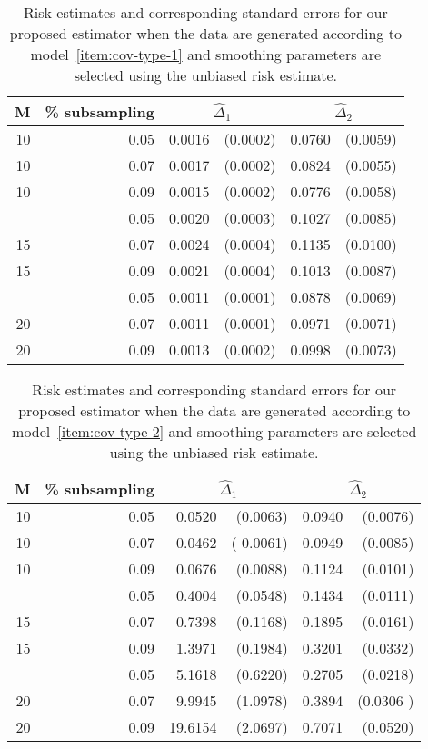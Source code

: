 \begin{table}[H] \label{table:simulation-2-sigma-1}
\centering
\begin{tabular}{rrrrrr}
M & \% subsampling &  \multicolumn{2}{c}{$\hat{\Delta}_1$}  &  \multicolumn{2}{c}{$\hat{\Delta}_2$} \\ 
  \hline
10 & 0.05 & 0.0016 & (0.0002) & 0.0760 & (0.0059) \\ 
  10 & 0.07 & 0.0017 & (0.0002) & 0.0824 & (0.0055) \\ 
  10 & 0.09 & 0.0015 & (0.0002) & 0.0776 & (0.0058) \\ 
    \hdashline
  15 & 0.05 & 0.0020 & (0.0003) & 0.1027 & (0.0085) \\ 
  15 & 0.07 & 0.0024 & (0.0004) & 0.1135 & (0.0100) \\ 
  15 & 0.09 & 0.0021 & (0.0004) & 0.1013 & (0.0087) \\ 
    \hdashline
  20 & 0.05 & 0.0011 & (0.0001) & 0.0878 & (0.0069) \\ 
  20 & 0.07 & 0.0011 & (0.0001) & 0.0971 & (0.0071) \\ 
  20 & 0.09 & 0.0013 & (0.0002) & 0.0998 & (0.0073) \\ 
   \hline
\end{tabular}
\caption{Risk estimates and corresponding standard errors for our proposed estimator when the data are generated according to model~\ref{item:cov-type-1}  and smoothing parameters are selected using the unbiased risk estimate.} 
\end{table}


\begin{table}[H] \label{table:simulation-2-sigma-2}
\centering
\begin{tabular}{rrrrrr}
M & \% subsampling &  \multicolumn{2}{c}{$\hat{\Delta}_1$}  &  \multicolumn{2}{c}{$\hat{\Delta}_2$} \\ 
  \hline
10 & 0.05 & 0.0520 & (0.0063) & 0.0940 & (0.0076) \\ 
  10 & 0.07 & 0.0462 &( 0.0061) & 0.0949 & (0.0085) \\ 
  10 & 0.09 & 0.0676 & (0.0088) & 0.1124 & (0.0101)\\ 
    \hdashline
  15 & 0.05 & 0.4004 & (0.0548) & 0.1434 & (0.0111) \\ 
  15 & 0.07 & 0.7398 & (0.1168) & 0.1895 & (0.0161) \\ 
  15 & 0.09 & 1.3971 & (0.1984) & 0.3201 & (0.0332) \\ 
    \hdashline
  20 & 0.05 & 5.1618 & (0.6220) & 0.2705 & (0.0218)\\ 
  20 & 0.07 & 9.9945 & (1.0978) & 0.3894 & (0.0306 )\\ 
  20 & 0.09 & 19.6154 & (2.0697) & 0.7071 & (0.0520) \\ 
   \hline
\end{tabular}
\caption{Risk estimates and corresponding standard errors for our proposed estimator when the data are generated according to model~\ref{item:cov-type-2}  and smoothing parameters are selected using the unbiased risk estimate.} 
\end{table}

